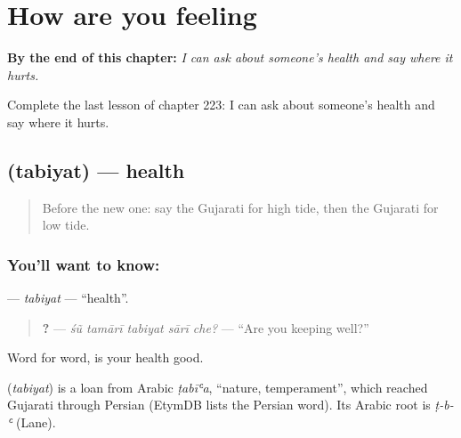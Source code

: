 
\chapter{How are you feeling}
\label{ch:gu-how-are-you-feeling}

\begin{chapteropening}
\textbf{By the end of this chapter:} \emph{I can ask about someone's health and say where it hurts.}

Complete the last lesson of chapter 223: I can ask about someone's health and say where it hurts.
\end{chapteropening}

\section[\texorpdfstring{\gu{તબિયત} (tabiyat)}{તબિયત (tabiyat)}]{ (tabiyat) — health}

\label{lesson:GU-C223-tabiyat}



\begin{quote}
Before the new one: say the Gujarati for high tide, then the Gujarati for low tide.
\end{quote}

\subsection*{You'll want to know: }
\textbf{} — \emph{tabiyat} — \textquotedblleft{}health\textquotedblright{}.

\begin{quote}
\textbf{    ?} — \emph{śũ tamārī tabiyat sārī che?} — \textquotedblleft{}Are you keeping well?\textquotedblright{}
\end{quote}

Word for word, is your health good.

\begin{cousinweb}
\textbf{} (\emph{tabiyat}) is a loan from Arabic \emph{ṭabīʿa}, \textquotedblleft{}nature, temperament\textquotedblright{}, which reached Gujarati through Persian (EtymDB lists the Persian word). Its Arabic root is \emph{ṭ-b-ʿ} (Lane).
\end{cousinweb}

